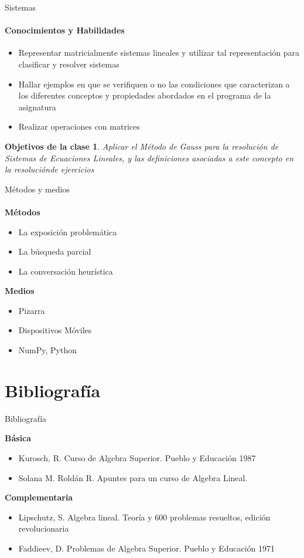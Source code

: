 \documentclass{beamer}
\newtheorem{cuadro2}{Objetivos de la clase}
\begin{document}
\begin{frame}{Sistemas}

  \framesubtitle{Conocimientos y Habilidades}
  \begin{itemize}
    \item Representar matricialmente sistemas lineales y utilizar tal representación para clasificar y resolver sistemas
    \item Hallar ejemplos en que se verifiquen o no las condiciones que caracterizan a los diferentes conceptos y propiedades abordados en el programa de la asignatura
    \item Realizar operaciones con matrices
  \end{itemize}
\end{frame}

\begin{frame}
  \begin{cuadro2}
    Aplicar el Método de Gauss para la resolución de Sistemas de Ecuaciones Lineales, y las definiciones asociadas
    a este concepto en la resoluciónde ejercicios
  \end{cuadro2}
\end{frame}

\begin{frame}{Métodos y medios}
  \framesubtitle{}
  {\bf Métodos}
  \begin{itemize}
    \item La exposición problemática
    \item La búsqueda parcial
    \item La conversación heurística
  \end{itemize}
  {\bf Medios}
  \begin{itemize}
    \item Pizarra
    \item Dispositivos Móviles
    \item NumPy, Python
  \end{itemize}
\end{frame}


\section{Bibliografía}
\begin{frame}{Bibliografía}
  
  
  {\bf Básica}
  \begin{itemize}
    \item Kurosch, R. Curso de Algebra Superior. Pueblo y Educación 1987
    \item Solana M. Roldán R. Apuntes para un curso de Algebra Lineal.
  \end{itemize}
  {\bf Complementaria}
  \begin{itemize}
    \item Lipschutz, S. Algebra lineal. Teoría y 600 problemas resueltos,
          edición revolucionaria
    \item Faddieev, D. Problemas de Algebra Superior. Pueblo y
          Educación 1971
  \end{itemize}
\end{frame}
\end{document}
